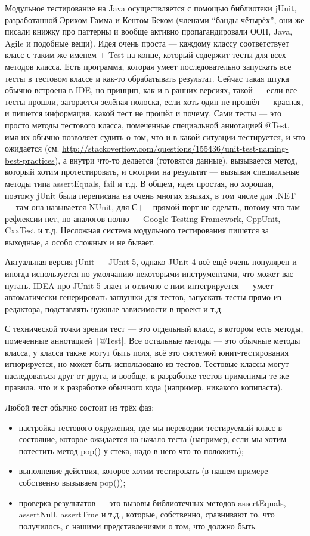 \documentclass[a5paper]{article}
\begin{document}
Модульное тестирование на Java осуществляется с помощью библиотеки jUnit, разработанной Эрихом Гамма и Кентом Беком (членами ``банды чётырёх'', они же писали книжку про паттерны и вообще активно пропагандировали ООП, Java, Agile и подобные вещи). Идея очень проста ---  каждому классу соответствует класс с таким же именем + Test на конце, который содержит тесты для всех методов класса. Есть программа, которая умеет последовательно запускать все тесты в тестовом классе и как-то обрабатывать результат. Сейчас такая штука обычно встроена в IDE, но принцип, как и в ранних версиях, такой --- если все тесты прошли, загорается зелёная полоска, если хоть один не прошёл --- красная, и пишется информация, какой тест не прошёл и почему. Сами тесты --- это просто методы тестового класса, помеченные специальной аннотацией @Test, имя их обычно позволяет судить о том, что и в какой ситуации тестируется, и что ожидается (см. \url{http://stackoverflow.com/questions/155436/unit-test-naming-best-practices}), а внутри что-то делается (готовятся данные), вызывается метод, который хотим протестировать, и смотрим на результат --- вызывая специальные методы типа assertEquals, fail и т.д. В общем, идея простая, но хорошая, поэтому jUnit была переписана на очень многих языках, в том числе для .NET --- там она называется NUnit, для С++ прямой порт не сделать, потому что там рефлексии нет, но аналогов полно --- Google Testing Framework, CppUnit, CxxTest и т.д. Несложная система модульного тестирования пишется за выходные, а особо сложных и не бывает.

Актуальная версия jUnit --- JUnit 5, однако JUnit 4 всё ещё очень популярен и иногда используется по умолчанию некоторыми инструментами, что может вас путать. IDEA про JUnit 5 знает и отлично с ним интегрируется --- умеет автоматически генерировать заглушки для тестов, запускать тесты прямо из редактора, подставлять нужные зависимости в проект и т.д.

С технической точки зрения тест --- это отдельный класс, в котором есть методы, помеченные аннотацией \texttt|@Test|. Все остальные методы --- это обычные методы класса, у класса также могут быть поля, всё это системой юнит-тестирования игнорируется, но может быть использовано из тестов. Тестовые классы могут наследоваться друг от друга, и вообще, к разработке тестов применимы те же правила, что и к разработке обычного кода (например, никакого копипаста).

Любой тест обычно состоит из трёх фаз:
\begin{itemize}
	\item настройка тестового окружения, где мы переводим тестируемый класс в состояние, которое ожидается на начало теста (например, если мы хотим потестить метод pop() у стека, надо в него что-то положить);
	\item выполнение действия, которое хотим тестировать (в нашем примере --- собственно вызываем pop());
	\item проверка результатов --- это вызовы библиотечных методов assertEquals, assertNull, assertTrue и т.д., которые, собственно, сравнивают то, что получилось, с нашими представлениями о том, что должно быть.
\end{itemize}
\end{document}

